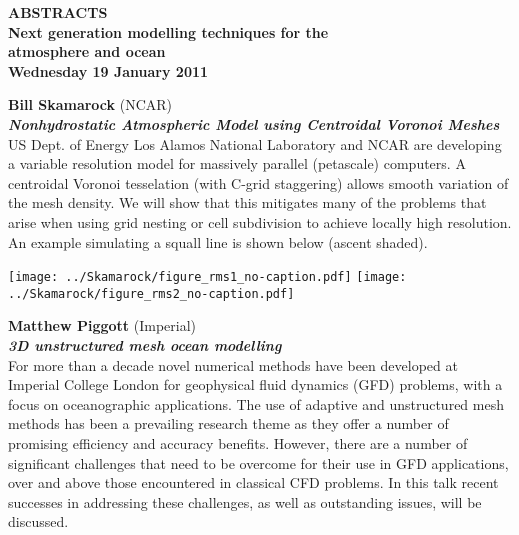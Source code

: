 

\begin{center}
\large\bf
    ABSTRACTS \\
    Next generation modelling techniques for the \\atmosphere and ocean \\
    Wednesday 19 January 2011
\end{center}

\begin{minipage}{\linewidth}\raggedright
{\bf Bill Skamarock} (NCAR) \\
\textbf{\textit{Nonhydrostatic Atmospheric Model using Centroidal Voronoi Meshes}}
\\
US Dept. of Energy Los Alamos National Laboratory and NCAR are developing a variable resolution model for massively parallel (petascale) computers. A centroidal Voronoi tesselation (with C-grid staggering) allows smooth variation of the mesh density. We will show that this mitigates many of the problems that arise when using grid nesting or cell subdivision to achieve locally high resolution. An example simulating a squall line is shown below (ascent shaded).

\texttt{[image: ../Skamarock/figure\_rms1\_no-caption.pdf]}
\texttt{[image: ../Skamarock/figure\_rms2\_no-caption.pdf]}

\end{minipage}

{\bf Matthew Piggott} (Imperial)\\
\textbf{\textit{3D unstructured mesh ocean modelling}}
\\
For more than a decade novel numerical methods have been developed at Imperial College London for geophysical fluid dynamics (GFD) problems, with a focus on oceanographic applications. The use of adaptive and unstructured mesh methods has been a prevailing research theme as they offer a number of promising efficiency and accuracy benefits. However, there are a number of significant challenges that need to be overcome for their use in GFD applications, over and above those encountered in classical CFD problems. In this talk recent successes in addressing these challenges, as well as outstanding issues, will be discussed.


